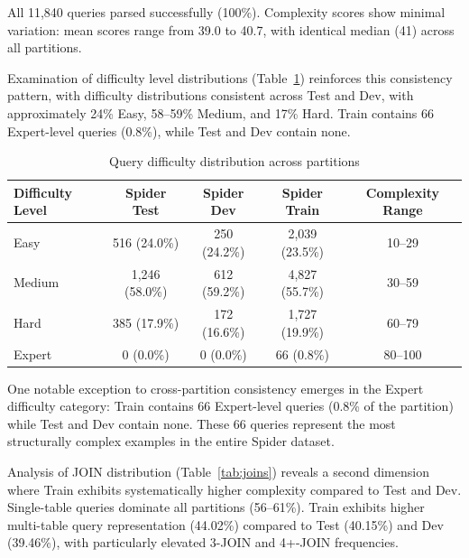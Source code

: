\documentclass[]{einformatica}
\begin{document}
All 11,840 queries parsed successfully (100\%). Complexity scores show minimal variation: mean scores range from 39.0 to 40.7, with identical median (41) across all partitions.

Examination of difficulty level distributions (Table~\ref{tab:difficulty}) reinforces this consistency pattern, with difficulty distributions consistent across Test and Dev, with approximately 24\% Easy, 58--59\% Medium, and 17\% Hard. Train contains 66 Expert-level queries (0.8\%), while Test and Dev contain none.

\begin{table}[ht]
    \caption{Query difficulty distribution across partitions}
    \label{tab:difficulty}
    \centering
    \footnotesize
    \begin{tabular}{lccc c}
        \toprule
        \textbf{Difficulty Level} & \textbf{Spider Test} & \textbf{Spider Dev} & \textbf{Spider Train} & \textbf{Complexity Range} \\
        \midrule
        Easy & 516 (24.0\%) & 250 (24.2\%) & 2,039 (23.5\%) & 10--29 \\
        Medium & 1,246 (58.0\%) & 612 (59.2\%) & 4,827 (55.7\%) & 30--59 \\
        Hard & 385 (17.9\%) & 172 (16.6\%) & 1,727 (19.9\%) & 60--79 \\
        Expert & 0 (0.0\%) & 0 (0.0\%) & 66 (0.8\%) & 80--100 \\
        \bottomrule
    \end{tabular}
\end{table}

One notable exception to cross-partition consistency emerges in the Expert difficulty category: Train contains 66 Expert-level queries (0.8\% of the partition) while Test and Dev contain none. These 66 queries represent the most structurally complex examples in the entire Spider dataset.

Analysis of JOIN distribution (Table~\ref{tab:joins}) reveals a second dimension where Train exhibits systematically higher complexity compared to Test and Dev. Single-table queries dominate all partitions (56--61\%). Train exhibits higher multi-table query representation (44.02\%) compared to Test (40.15\%) and Dev (39.46\%), with particularly elevated 3-JOIN and 4+-JOIN frequencies.
\end{document}
